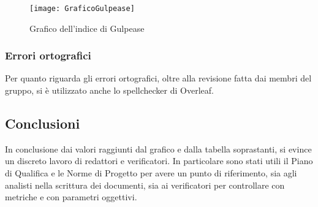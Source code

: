 \newpage
\begin{figure}[htp]
    \centering
    \texttt{[image: GraficoGulpease]}
    \caption{Grafico dell'indice di Gulpease}
    \label{fig:img-valori-gulpease}
\end{figure}


\subsubsection{Errori ortografici}

Per quanto riguarda gli errori ortografici, oltre alla revisione fatta dai membri del gruppo, si è utilizzato anche lo spellchecker di Overleaf.


\subsection{Conclusioni}

In conclusione dai valori raggiunti dal grafico e dalla tabella soprastanti, si evince un discreto lavoro di redattori e verificatori.
In particolare sono stati utili il Piano di Qualifica e le Norme di Progetto per avere un punto di riferimento, sia agli analisti nella scrittura dei documenti, sia ai verificatori per controllare con metriche e con parametri oggettivi.

